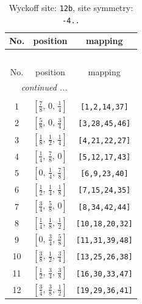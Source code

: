\documentclass[fleqn,8pt]{jsarticle}
\begin{document}
\renewcommand{\arraystretch}{1.2}
\begin{longtable}{ccc}
\caption{Wyckoff site: {\tt 12b}, site symmetry: {\tt -4..}}
 \\
 \hline \hline
No. & position & mapping \\ \hline \endfirsthead

\multicolumn{2}{l}{\tablename\ \thetable{}} \\
 \hline \hline
No. & position & mapping \\ \hline \endhead

 \hline \hline
\multicolumn{2}{r}{\footnotesize\it continued ...} \\ \endfoot

 \hline \hline
\multicolumn{2}{r}{} \\ \endlastfoot

1 & $\left[ \frac{7}{8},\, 0,\, \frac{1}{4} \right]$ & {\tt [1,2,14,37]} \\ \hline
2 & $\left[ \frac{5}{8},\, 0,\, \frac{3}{4} \right]$ & {\tt [3,28,45,46]} \\ \hline
3 & $\left[ \frac{1}{8},\, \frac{1}{2},\, \frac{1}{4} \right]$ & {\tt [4,21,22,27]} \\ \hline
4 & $\left[ \frac{1}{4},\, \frac{7}{8},\, 0 \right]$ & {\tt [5,12,17,43]} \\ \hline
5 & $\left[ 0,\, \frac{1}{4},\, \frac{7}{8} \right]$ & {\tt [6,9,23,40]} \\ \hline
6 & $\left[ \frac{1}{2},\, \frac{1}{4},\, \frac{1}{8} \right]$ & {\tt [7,15,24,35]} \\ \hline
7 & $\left[ \frac{3}{4},\, \frac{5}{8},\, 0 \right]$ & {\tt [8,34,42,44]} \\ \hline
8 & $\left[ \frac{1}{4},\, \frac{1}{8},\, \frac{1}{2} \right]$ & {\tt [10,18,20,32]} \\ \hline
9 & $\left[ 0,\, \frac{3}{4},\, \frac{5}{8} \right]$ & {\tt [11,31,39,48]} \\ \hline
10 & $\left[ \frac{3}{8},\, \frac{1}{2},\, \frac{3}{4} \right]$ & {\tt [13,25,26,38]} \\ \hline
11 & $\left[ \frac{1}{2},\, \frac{3}{4},\, \frac{3}{8} \right]$ & {\tt [16,30,33,47]} \\ \hline
12 & $\left[ \frac{3}{4},\, \frac{3}{8},\, \frac{1}{2} \right]$ & {\tt [19,29,36,41]} \\
\end{longtable}
\renewcommand{\arraystretch}{1.2}
\end{document}
